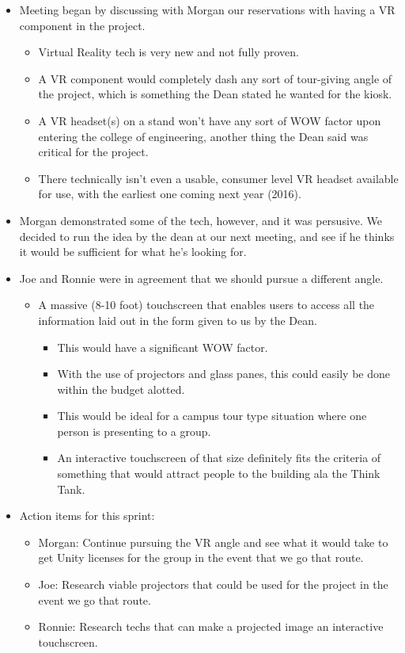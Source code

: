 \documentclass[]{article}
\begin{document}
	\begin{itemize}
		\item Meeting began by discussing with Morgan our reservations with having a VR component in the project. 
			\begin{itemize}
				\item Virtual Reality tech is very new and not fully proven.
				\item A VR component would completely dash any sort of tour-giving angle of the project, which is something the Dean stated he wanted for the kiosk. 
				\item A VR headset(s) on a stand won't have any sort of WOW factor upon entering the college of engineering, another thing the Dean said was critical for the project.
				\item There technically isn't even a usable, consumer level VR headset available for use, with the earliest one coming next year (2016). 
			\end{itemize}
		\item Morgan demonstrated some of the tech, however, and it was persusive. We decided to run the idea by 
		the dean at our next meeting, and see if he thinks it would be sufficient for what he's looking for. 
		\item Joe and Ronnie were in agreement that we should pursue a different angle.
			\begin{itemize}
				\item A massive (8-10 foot) touchscreen that enables users to access all the information laid out in the form given to us by the Dean. 
					\begin{itemize}
						\item This would have a significant WOW factor. 
						\item With the use of projectors and glass panes, this could easily be done within the budget alotted.
						\item This would be ideal for a campus tour type situation where one person is presenting to a group. 
						\item An interactive touchscreen of that size definitely fits the criteria of something that would attract people to the building ala the Think Tank. 
					\end{itemize}
			\end{itemize}
		\item Action items for this sprint:
			\begin{itemize}
				\item Morgan: Continue pursuing the VR angle and see what it would take to get Unity licenses for the group in the event that we go that route.
				\item Joe: Research viable projectors that could be used for the project in the event we go that route.
				\item Ronnie: Research techs that can make a projected image an interactive touchscreen.
			\end{itemize}
	\end{itemize}
	
\end{document}
